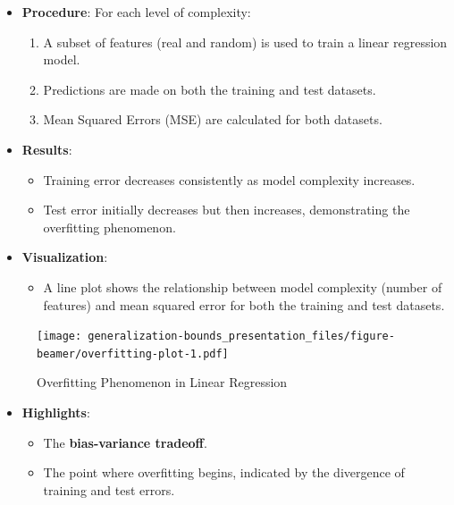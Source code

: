 \documentclass[
  ignorenonframetext,
]{beamer}
\providecommand{\tightlist}{%
  \setlength{\itemsep}{0pt}\setlength{\parskip}{0pt}}\usepackage{longtable,booktabs,array}
\begin{document}
\begin{frame}
\begin{itemize}
\tightlist
\item
  \textbf{Procedure}: For each level of complexity:

  \begin{enumerate}
  \tightlist
  \item
    A subset of features (real and random) is used to train a linear
    regression model.
  \item
    Predictions are made on both the training and test datasets.
  \item
    Mean Squared Errors (MSE) are calculated for both datasets.
  \end{enumerate}
\item
  \textbf{Results}:

  \begin{itemize}
  \tightlist
  \item
    Training error decreases consistently as model complexity increases.
  \item
    Test error initially decreases but then increases, demonstrating the
    overfitting phenomenon.
  \end{itemize}
\item
  \textbf{Visualization}:

  \begin{itemize}
  \tightlist
  \item
    A line plot shows the relationship between model complexity (number
    of features) and mean squared error for both the training and test
    datasets.
  \end{itemize}
\end{itemize}
\end{frame}

\begin{frame}
\begin{figure}[H]

{\centering \texttt{[image: generalization-bounds\_presentation\_files/figure-beamer/overfitting-plot-1.pdf]}

}

\caption{Overfitting Phenomenon in Linear Regression}

\end{figure}%

\begin{itemize}
\tightlist
\item
  \textbf{Highlights}:

  \begin{itemize}
  \tightlist
  \item
    The \textbf{bias-variance tradeoff}.
  \item
    The point where overfitting begins, indicated by the divergence of
    training and test errors.
  \end{itemize}
\end{itemize}
\end{frame}
\end{document}
